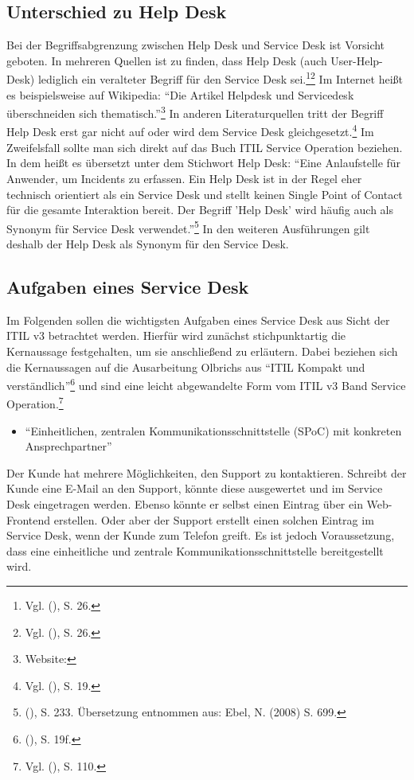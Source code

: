 \subsection{Unterschied zu Help Desk}
\noindent
Bei der Begriffsabgrenzung zwischen Help Desk und Service Desk ist Vorsicht geboten. In mehreren Quellen ist zu finden, dass Help Desk (auch User-Help-Desk) lediglich ein veralteter Begriff für den Service Desk sei.\footnote{Vgl. \citeauthor{Buchsein} (\citeyear{Buchsein}), S. 26.}\footnote{Vgl. \citeauthor{Meier} (\citeyear{Meier}), S. 26.} Im Internet heißt es beispielsweise auf Wikipedia: \enquote{Die Artikel Helpdesk und Servicedesk überschneiden sich thematisch.}\footnote{Website:\cite{WikiServiceDesk}} In anderen Literaturquellen tritt der Begriff Help Desk erst gar nicht auf oder wird dem Service Desk gleichgesetzt.\footnote{Vgl. \citeauthor{Olbrich} (\citeyear{Olbrich}), S. 19.} Im Zweifelsfall sollte man sich direkt auf das Buch ITIL Service Operation beziehen. In dem heißt es übersetzt unter dem Stichwort Help Desk:
\enquote{Eine Anlaufstelle für Anwender, um Incidents zu erfassen. Ein Help Desk ist in der
Regel eher technisch orientiert als ein Service Desk und stellt keinen Single Point
of Contact für die gesamte Interaktion bereit. Der Begriff 'Help Desk' wird häufig
auch als Synonym für Service Desk verwendet.}\footnote{\citeauthor{Cannon} (\citeyear{Cannon}), S. 233. Übersetzung entnommen aus: Ebel, N. (2008) S. 699.} \newline
In den weiteren Ausführungen gilt deshalb der Help Desk als Synonym für den Service Desk.

\newpage


\subsection{Aufgaben eines Service Desk}
\noindent
Im Folgenden sollen die wichtigsten Aufgaben eines Service Desk aus Sicht der ITIL v3 betrachtet werden. Hierfür wird zunächst stichpunktartig die Kernaussage festgehalten, um sie anschließend zu erläutern. Dabei beziehen sich die Kernaussagen auf die Ausarbeitung Olbrichs aus \enquote{ITIL Kompakt und verständlich}\footnote{\citeauthor{Olbrich} (\citeyear{Olbrich}), S. 19f.}
und sind eine leicht abgewandelte Form vom ITIL v3 Band Service Operation.\footnote{Vgl. \citeauthor{Cannon} (\citeyear{Cannon}), S. 110.}

\begin{itemize}
\item \enquote{Einheitlichen, zentralen Kommunikationsschnittstelle (SPoC) mit konkreten Ansprechpartner}
\end{itemize}
\noindent
Der Kunde hat mehrere Möglichkeiten, den Support zu kontaktieren. Schreibt der Kunde eine E-Mail an den Support, könnte diese ausgewertet und im Service Desk eingetragen werden. Ebenso könnte er selbst einen Eintrag über ein Web-Frontend erstellen. Oder aber der Support erstellt einen solchen Eintrag im Service Desk, wenn der Kunde zum Telefon greift. Es ist jedoch Voraussetzung, dass eine einheitliche und zentrale Kommunikationsschnittstelle bereitgestellt wird.


